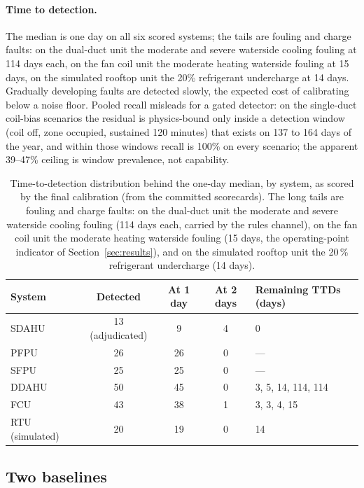 \documentclass[11pt,letterpaper]{article}
\begin{document}
\paragraph{Time to detection.} The median is one day on all six scored systems; the tails are fouling and charge faults: on the dual-duct unit the moderate and severe waterside cooling fouling at 114 days each, on the fan coil unit the moderate heating waterside fouling at 15 days, on the simulated rooftop unit the 20\% refrigerant undercharge at 14 days. Gradually developing faults are detected slowly, the expected cost of calibrating below a noise floor. Pooled recall misleads for a gated detector: on the single-duct coil-bias scenarios the residual is physics-bound only inside a detection window (coil off, zone occupied, sustained 120 minutes) that exists on 137 to 164 days of the year, and within those windows recall is 100\% on every scenario; the apparent 39--47\% ceiling is window prevalence, not capability.

\begin{table}[htbp]
\centering
\caption{Time-to-detection distribution behind the one-day median, by system, as scored by the final calibration (from the committed scorecards). The long tails are fouling and charge faults: on the dual-duct unit the moderate and severe waterside cooling fouling (114 days each, carried by the rules channel), on the fan coil unit the moderate heating waterside fouling (15 days, the operating-point indicator of Section~\ref{sec:results}), and on the simulated rooftop unit the 20\,\% refrigerant undercharge (14 days).}
\label{tab:ttd}
\begin{tabular}{lcccl}
\hline
System & Detected & At 1 day & At 2 days & Remaining TTDs (days) \\
\hline
SDAHU & 13 (adjudicated) & 9 & 4 & 0 \\
PFPU & 26 & 26 & 0 & --- \\
SFPU & 25 & 25 & 0 & --- \\
DDAHU & 50 & 45 & 0 & 3, 5, 14, 114, 114 \\
FCU & 43 & 38 & 1 & 3, 3, 4, 15 \\
RTU (simulated) & 20 & 19 & 0 & 14 \\
\hline
\end{tabular}

\end{table}


\subsection{Two baselines}
\end{document}
